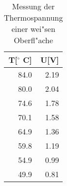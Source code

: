 \begin{table}
\begin{center}
\begin{tabular}{r|r}
T[$^\circ$ C] & U[V] \\
\hline
84.0 & 2.19 \\
80.0 & 2.04 \\
74.6 & 1.78 \\
70.1 & 1.58 \\
64.9 & 1.36 \\
59.8 & 1.19 \\
54.9 & 0.99 \\
49.9 & 0.81 \\
\end{tabular}
\caption[Thermospannung]{Messung der Thermospannung einer wei"sen Oberfl"ache}
\label{weiss}
\end{center}
\end{table}

